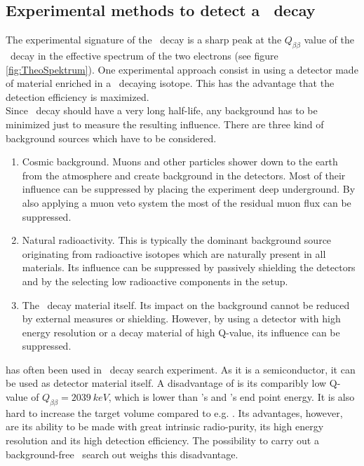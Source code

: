 \documentclass[encoding=utf8,british]{tumphthesis}
\begin{document}
\subsection{Experimental methods to detect a \onbb\ decay}

The experimental signature of the \onbb\ decay is a sharp peak at the $Q_{\beta\beta}$ value of the \twonu\ decay in the effective spectrum of the two electrons (see figure \ref{fig:TheoSpektrum}).
One experimental approach consist in using a detector made of material enriched in a \onbb\ decaying isotope.
This has the advantage that the detection efficiency is maximized.
\\

Since \onbb\ decay should have a very long half-life, any background has to be minimized just to measure the resulting influence.
There are three kind of background sources which have to be considered.
\begin{enumerate}
    \item Cosmic background.
Muons and other particles shower down to the earth from the atmosphere and create background in the detectors.
Most of their influence can be suppressed by placing the experiment deep underground.
By also applying a muon veto system the most of the residual muon flux can be suppressed.
\item Natural radioactivity.
This is typically the dominant background source originating from radioactive isotopes which are naturally present in all materials.
Its influence can be suppressed by passively shielding the detectors and by the selecting low radioactive components in the setup. 
\item The \twonu\ decay material itself.
Its impact on the background cannot be reduced by external measures or shielding.
However, by using a detector with high energy resolution or a decay material of high Q-value, its influence can be suppressed.
\end{enumerate}
 has often been used in \onbb\ decay search experiment. 
As it is a semiconductor, it can be used as detector material itself.
A disadvantage of  is its comparibly low Q-value of $Q_{\beta\beta} = 2039 \ \unit{keV}$, which is lower than 's and 's end point energy\cite{barabash_brief_2017}.
It is also hard to increase the target volume compared to e.g.  \cite{barabash_brief_2017}.
Its advantages, however, are its ability to be made with great intrinsic radio-purity, its high energy resolution and its high detection efficiency.
The possibility to carry out a background-free \onbb\ search \cite{agostini_background_2017} out weighs this disadvantage.
\\
\end{document}
